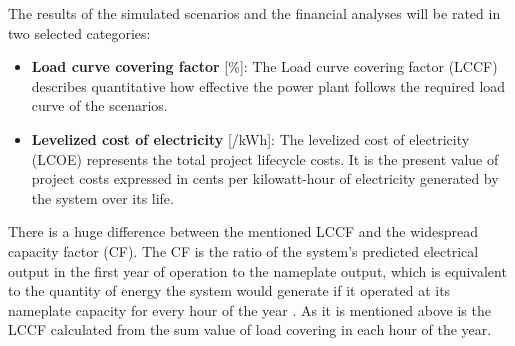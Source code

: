 \documentclass[Master,MEE,english]{twbook}%
\begin{document}
The results of the simulated scenarios and the financial analyses will be rated in two selected categories:
\begin{itemize}
\item \textbf{Load curve covering factor} [\%]: The Load curve covering factor (LCCF) describes quantitative how effective the power plant follows the required load curve of the scenarios.
\item \textbf{Levelized cost of electricity} [\textcent /kWh]: The levelized cost of electricity (LCOE) represents the total project lifecycle costs. It is the present value of project costs expressed in cents per kilowatt-hour of electricity generated by the system over its life. \cite{NREL2015a}
\end{itemize}
There is a huge difference between the mentioned LCCF and the widespread capacity factor (CF). The CF is the ratio of the system's predicted electrical output in the first year of operation to the nameplate output, which is equivalent to the quantity of energy the system would generate if it operated at its nameplate capacity for every hour of the year \cite{NREL2015a}. As it is mentioned above is the LCCF calculated from the sum value of load covering in each hour of the year.
\end{document}

